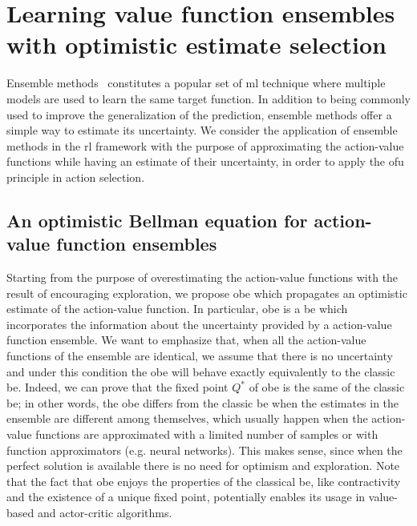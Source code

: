 \section{Learning value function ensembles with optimistic estimate selection}
\label{sec:obe}
Ensemble methods~\cite{opitz1999popular} constitutes a popular set of \gls{ml} technique where multiple models are used to learn the same target function. In addition to being commonly used to improve the generalization of the prediction, ensemble methods offer a simple way to estimate its uncertainty. We consider the application of ensemble methods in the \gls{rl} framework with the purpose of approximating the action-value functions while having an estimate of their uncertainty, in order to apply the \gls{ofu} principle in action selection.

\subsection{An optimistic Bellman equation for action-value function ensembles}
Starting from the purpose of overestimating the action-value functions with the result of encouraging exploration, we propose \gls{obe} which propagates an optimistic estimate of the action-value function. In particular, \gls{obe} is a \gls{be} which incorporates the information about the uncertainty provided by a action-value function ensemble. We want to emphasize that, when all the action-value functions of the ensemble are identical, we assume that there is no uncertainty and under this condition the \gls{obe} will behave exactly equivalently to the classic \gls{be}. Indeed, we can prove that the fixed point $Q^*$ of \gls{obe} is the same of the classic \gls{be}; in other words, the \gls{obe} differs from the classic \gls{be} when the estimates in the ensemble are different among themselves, which usually happen when the action-value functions are approximated with a limited number of samples or with function approximators (e.g. neural networks). This makes sense, since when the perfect solution is available there is no need for optimism and exploration. 
Note that the fact that \gls{obe} enjoys the properties of the classical \gls{be}, like contractivity and the existence of a unique fixed point, potentially enables its usage in value-based and actor-critic algorithms.

